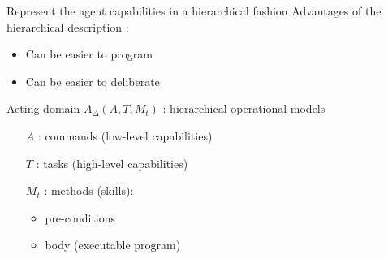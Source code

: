 \begin{frame}{Represent the agent capabilities in a hierarchical fashion}
Advantages of the hierarchical description : 
    \begin{itemize}
        \pause
        \item Can be easier to program
        \pause
        \item Can be easier to deliberate
    \end{itemize}
\centering
    Acting domain \textbf{$A_\Delta (A, T, M_t)$} : hierarchical operational models
    \small
    \pause
    \begin{itemize}
        \item[$A$] : commands (low-level capabilities)
        \pause
        \item[$T$] : tasks (high-level capabilities)
        \pause
        \item[$M_t$] : methods (skills):
        \begin{itemize}
            \item pre-conditions
            \item body (executable program)
        \end{itemize}
    \end{itemize}

    
\end{frame}



